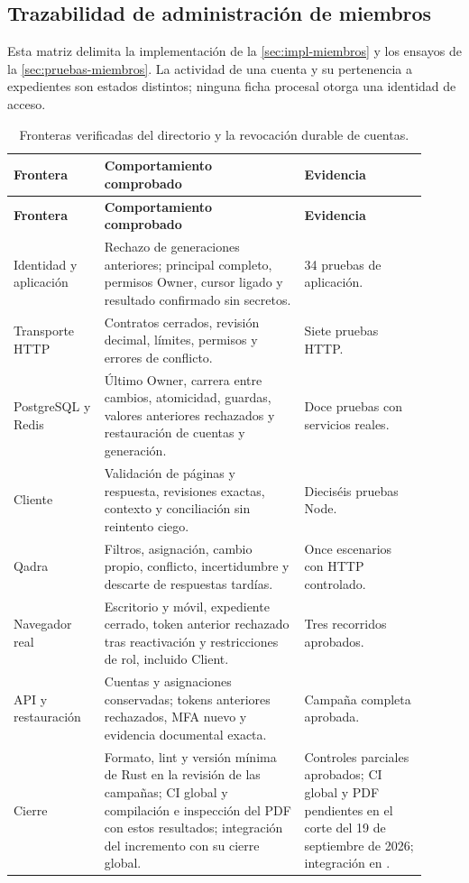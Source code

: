 \subsection{Trazabilidad de administración de miembros}\label{anexo:miembros}

Esta matriz delimita la implementación de la \cref{sec:impl-miembros} y los ensayos de la \cref{sec:pruebas-miembros}. La actividad de una cuenta y su pertenencia a expedientes son estados distintos; ninguna ficha procesal otorga una identidad de acceso.

\begin{longtable}{@{}L{0.20\linewidth}L{0.44\linewidth}L{0.27\linewidth}@{}}
  \caption[Verificación de miembros y acceso]{Fronteras verificadas del directorio y la revocación durable de cuentas.}\label{tab:miembros-verificacion}\\
  \toprule
  \textbf{Frontera} & \textbf{Comportamiento comprobado} & \textbf{Evidencia} \\
  \midrule
  \endfirsthead
  \toprule
  \textbf{Frontera} & \textbf{Comportamiento comprobado} & \textbf{Evidencia} \\
  \midrule
  \endhead
  \bottomrule
  \endfoot
  Identidad y aplicación & Rechazo de generaciones anteriores; principal completo, permisos Owner, cursor ligado y resultado confirmado sin secretos. & 34 pruebas de aplicación. \\
  Transporte HTTP & Contratos cerrados, revisión decimal, límites, permisos y errores de conflicto. & Siete pruebas HTTP. \\
  PostgreSQL y Redis & Último Owner, carrera entre cambios, atomicidad, guardas, valores anteriores rechazados y restauración de cuentas y generación. & Doce pruebas con servicios reales. \\
  Cliente & Validación de páginas y respuesta, revisiones exactas, contexto y conciliación sin reintento ciego. & Dieciséis pruebas Node. \\
  Qadra & Filtros, asignación, cambio propio, conflicto, incertidumbre y descarte de respuestas tardías. & Once escenarios con HTTP controlado. \\
  Navegador real & Escritorio y móvil, expediente cerrado, token anterior rechazado tras reactivación y restricciones de rol, incluido Client. & Tres recorridos aprobados. \\
  API y restauración & Cuentas y asignaciones conservadas; tokens anteriores rechazados, MFA nuevo y evidencia documental exacta. & Campaña completa aprobada. \\
  Cierre & Formato, lint y versión mínima de Rust en la revisión de las campañas; CI global y compilación e inspección del PDF con estos resultados; integración del incremento con su cierre global. & Controles parciales aprobados; CI global y PDF pendientes en el corte del 19 de septiembre de 2026; integración en . \\
\end{longtable}

